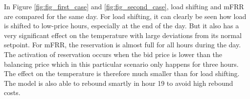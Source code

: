 In Figure \ref{fig:fig_first_case} and \ref{fig:fig_second_case}, load shifting and mFRR are compared for the same day. For load shifting, it can clearly be seen how load is shifted to low-price hours, especially at the end of the day. But it also has a very significant effect on the temperature with large deviations from its normal setpoint. For mFRR, the reservation is almost full for all hours during the day. The activation of reservation occurs when the bid price is lower than the balancing price which in this particular scenario only happens for three hours. The effect on the temperature is therefore much smaller than for load shifting. The model is also able to rebound smartly in hour 19 to avoid high rebound costs.


